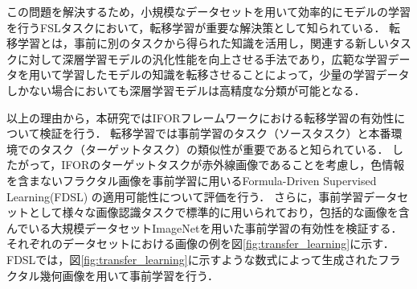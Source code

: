 \documentclass[a4paper,11pt,nomag]{jsreport}
\begin{document}
この問題を解決するため，小規模なデータセットを用いて効率的にモデルの学習を行うFSLタスクにおいて，転移学習が重要な解決策として知られている．
転移学習とは，事前に別のタスクから得られた知識を活用し，関連する新しいタスクに対して深層学習モデルの汎化性能を向上させる手法であり，広範な学習データを用いて学習したモデルの知識を転移させることによって，少量の学習データしかない場合においても深層学習モデルは高精度な分類が可能となる．

以上の理由から，本研究ではIFORフレームワークにおける転移学習の有効性について検証を行う．
転移学習では事前学習のタスク（ソースタスク）と本番環境でのタスク（ターゲットタスク）の類似性が重要であると知られている．
したがって，IFORのターゲットタスクが赤外線画像であることを考慮し，色情報を含まないフラクタル画像を事前学習に用いるFormula-Driven Supervised Learning(FDSL) \cite{fdsl}の適用可能性について評価を行う．
さらに，事前学習データセットとして様々な画像認識タスクで標準的に用いられており，包括的な画像を含んでいる大規模データセットImageNetを用いた事前学習の有効性を検証する．
それぞれのデータセットにおける画像の例を図\ref{fig:transfer_learning}に示す．
FDSLでは，図\ref{fig:transfer_learning}に示すような数式によって生成されたフラクタル幾何画像を用いて事前学習を行う．
\end{document}
